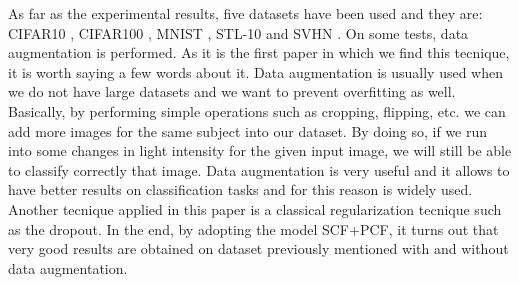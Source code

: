 As far as the experimental results, five datasets have been used and they are: CIFAR10 \citep{CIFAR10and100}, CIFAR100 \citep{CIFAR10and100}, MNIST \citep{MNIST}, STL-10 \citep{STL10} and SVHN \citep{SVHN}. On some tests, data augmentation is performed. As it is the first paper in which we find this tecnique, it is worth saying a few words about it. Data augmentation is usually used when we do not have large datasets and we want to prevent overfitting as well. Basically, by performing simple operations such as cropping, flipping, etc. we can add more images for the same subject into our dataset. By doing so, if we run into some changes in light intensity for the given input image, we will still be able to classify correctly that image. Data augmentation is very useful and it allows to have better results on classification tasks and for this reason is widely used. Another tecnique applied in this paper is a classical regularization tecnique such as the dropout. In the end, by adopting the model SCF+PCF, it turns out that very good results are obtained on dataset previously mentioned with and without data augmentation. 
